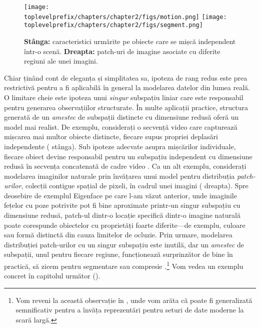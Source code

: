 \documentclass[../../book-main_ro.tex]{subfiles}
\begin{document}
\begin{figure}
    \centering
    \texttt{[image: \\toplevelprefix/chapters/chapter2/figs/motion.png]} \hspace{5mm}
    \texttt{[image: \\toplevelprefix/chapters/chapter2/figs/segment.png]} 
    \caption{\textbf{Stânga:} caracteristici urmărite pe obiecte care se mișcă independent într-o scenă. \textbf{Dreapta:} patch-uri de imagine asociate cu diferite regiuni ale unei imagini.}
    \label{fig:multiple-subspaces}
\end{figure}
Chiar ținând cont de eleganța și simplitatea sa, ipoteza de rang redus este prea restrictivă pentru a fi aplicabilă în general la modelarea datelor din lumea reală.
O limitare cheie este ipoteza unui \textit{singur} subspațiu liniar care este responsabil pentru generarea observațiilor structurate.
În multe aplicații practice, structura generată de un \textit{amestec} de
subspații distincte cu dimensiune redusă oferă un model mai realist.
De exemplu, considerați o secvență video care capturează mișcarea mai multor obiecte distincte, fiecare supus propriei deplasări independente ( stânga).
Sub ipoteze adecvate asupra mișcărilor individuale, fiecare obiect devine responsabil pentru un subspațiu independent cu dimensiune redusă în secvența concatenată de cadre video \cite{VidalR2004-ECCV}.
Ca un alt exemplu, considerați modelarea imaginilor naturale prin învățarea unui model pentru
distribuția \textit{patch-urilor}, colecții contigue spațial de
pixeli, în cadrul unei imagini ( dreapta). Spre deosebire de
exemplul Eigenface pe care l-am văzut anterior, unde imaginile fețelor cu poze
potrivite pot fi bine aproximate printr-un singur subspațiu cu dimensiune redusă, patch-ul
dintr-o locație specifică dintr-o imagine naturală poate corespunde obiectelor cu
proprietăți foarte diferite---de exemplu, culoare sau formă distinctă din cauza
limitelor de ocluzie. Prin urmare, modelarea distribuției patch-urilor cu un singur
subspațiu este inutilă, dar un \textit{amestec} de subspații, unul pentru fiecare regiune,
funcționează surprinzător de bine în practică, să zicem pentru segmentare sau compresie
\cite{Mobahi-IJCV2011}.\footnote{Vom reveni la această observație în
, unde vom arăta că poate fi generalizată semnificativ
pentru a învăța reprezentări pentru seturi de date moderne la scară largă.} Vom vedea un exemplu concret în capitolul următor ().
\end{document}
